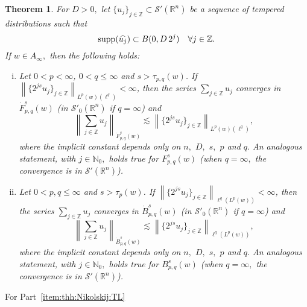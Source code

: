 \documentclass[final,letterpaper,12pt,oneside]{class_diss}
\newtheorem{theorem}{Theorem}[section]
\theoremstyle{remark}
\newcommand{\naz}{\mathbb{N}_0}
\newcommand{\ent}{\mathbb{Z}}
\newcommand{\rn}{{{\mathbb R}^n}}
\newcommand{\swp}{{\mathcal{S}'}(\rn)}
\newcommand{\tlw}[4]{\dot F_{#1,#3}^{#2}(#4)} %
\newcommand{\itlw}[4]{F_{#1,#3}^{#2}(#4)} %
\newcommand{\besw}[4]{\dot B_{#1,#3}^{#2}(#4)} %
\newcommand{\ibesw}[4]{B_{#1,#3}^{#2}(#4)} %
\newcommand{\norm}[2]{\left\|#1\right\|_{#2}}
\newcommand{\supp}{{\rm{supp}}}
\newcommand{\A}{D}
\begin{document}
\begin{theorem}\label{thm:Nikolskij:weighted} For $\A> 0,$ let $\{u_j\}_{j \in \ent} \subset \mathcal{S}'(\rn)$ be a sequence of tempered distributions such that
\begin{equation*}
\supp(\widehat{u_j}) \subset B(0, \A\, 2^j ) \quad \forall j \in \ent.
\end{equation*}
If $w\in A_\infty,$ then the following holds:  
\begin{enumerate}[(i)]
\item\label{item:thh:Nikolskij:TL} Let $0 < p < \infty$, $0 < q \leq \infty$ and $s > \tau_{p,q}(w)$. If $\norm{\{2^{js} u_j\}_{j\in\ent}}{L^p(w)(\ell^{q})} < \infty$, then the series $\sum_{j \in \ent} u_j$ converges in $\tlw{p}{s}{q}{w}$ (in $\mathcal{S}'_0(\rn)$ if $q=\infty$) and 
\begin{equation*}
\norm{\sum_{j \in \ent} u_j}{\tlw{p}{s}{q}{w}} \lesssim  \norm{\{2^{js} u_j\}_{j\in\ent}}{L^p(w)(\ell^{q})},
\end{equation*}
where the implicit constant depends only on $n,$ $\A,$ $s,$ $p$ and  $q.$  An analogous statement, with $j\in\naz,$ holds true for $\itlw{p}{s}{q}{w}$ (when $q=\infty,$  the convergence is in $\swp$).
\item\label{item:thh:Nikolskij:B} Let $0 < p, q \leq \infty$ and $s > \tau_p(w)$. If $\norm{\{2^{js} u_j\}_{j\in\ent}}{\ell^{q}(L^p(w))} < \infty$, then the series $\sum_{j \in \ent} u_j$ converges in  $\besw{p}{s}{q}{w}$ (in $\mathcal{S}'_0(\rn)$ if $q=\infty$) and 
\begin{equation*}
\norm{\sum_{j \in \ent} u_j}{\besw{p}{s}{q}{w}} \lesssim  \norm{\{2^{js} u_j\}_{j\in\ent}}{\ell^{q}(L^p(w))},
\end{equation*}
where the implicit constant depends only on $n,$ $\A,$ $s,$ $p$ and $q.$   An analogous statement, with $j\in\naz,$ holds true for $\ibesw{p}{s}{q}{w}$ (when $q=\infty,$  the convergence is in $\swp$).
\end{enumerate}
\end{theorem}

For Part~\eqref{item:thh:Nikolskij:TL}

 
\end{document}
